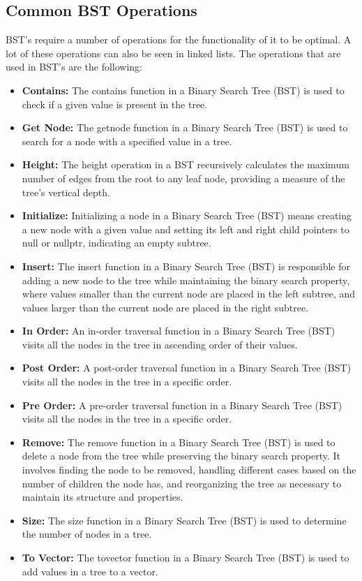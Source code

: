 \subsection*{Common BST Operations}

BST's require a number of operations for the functionality of it to be optimal. A lot of these operations can also be seen in linked lists. The operations that are used in BST's are the following:

\begin{itemize}
    \item \textbf{Contains:} The contains function in a Binary Search Tree (BST) is used to check if a given value is present in the tree.
    \item \textbf{Get Node:} The getnode function in a Binary Search Tree (BST) is used to search for a node with a specified value in a tree.
    \item \textbf{Height:} The height operation in a BST recursively calculates the maximum number of edges from the root to any leaf node, providing a measure of the tree's vertical depth.
    \item \textbf{Initialize:} Initializing a node in a Binary Search Tree (BST) means creating a new node with a given value and setting its left and right child pointers to null or nullptr, indicating an empty subtree.
    \item \textbf{Insert:} The insert function in a Binary Search Tree (BST) is responsible for adding a new node to the tree while maintaining the binary search property, where values smaller than the current node are 
    placed in the left subtree, and values larger than the current node are placed in the right subtree.
    \item \textbf{In Order:} An in-order traversal function in a Binary Search Tree (BST) visits all the nodes in the tree in ascending order of their values.
    \item \textbf{Post Order:} A post-order traversal function in a Binary Search Tree (BST) visits all the nodes in the tree in a specific order.
    \item \textbf{Pre Order:} A pre-order traversal function in a Binary Search Tree (BST) visits all the nodes in the tree in a specific order.
    \item \textbf{Remove:} The remove function in a Binary Search Tree (BST) is used to delete a node from the tree while preserving the binary search property. It involves finding the node to be removed, handling different 
    cases based on the number of children the node has, and reorganizing the tree as necessary to maintain its structure and properties.
    \item \textbf{Size:} The size function in a Binary Search Tree (BST) is used to determine the number of nodes in a tree.
    \item \textbf{To Vector:} The tovector function in a Binary Search Tree (BST) is used to add values in a tree to a vector.
\end{itemize}

